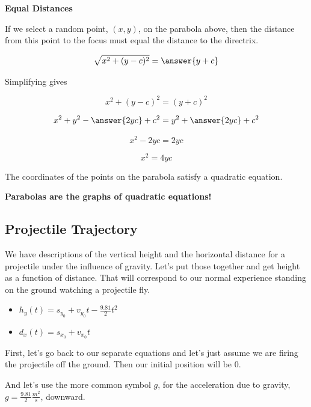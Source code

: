 \documentclass{ximera}
\begin{document}
\begin{idea} \textbf{\textcolor{blue!55!black}{Equal Distances}} 


If we select a random point, $(x,y)$, on the parabola above, then the distance from this point to the focus must equal the distance to the directrix.


\[  \sqrt{x^2 + (y-c)^2} = \answer{y+c}   \]


Simplifying gives


\[  x^2 + (y-c)^2 = (y+c)^2   \]

\[  x^2 + y^2 - \answer{2 y c} + c^2 = y^2 + \answer{2 y c} + c^2   \]

\[  x^2  - 2 y c  =  2 y c    \]

\[  x^2   =  4 y c    \]


The coordinates of the points on the parabola satisfy a quadratic equation.  


\begin{center}
\textbf{\textcolor{red!80!black}{Parabolas are the graphs of quadratic equations!}}
\end{center}


\end{idea}








\subsection*{Projectile Trajectory}


We have descriptions of the vertical height and the horizontal distance for a projectile under the influence of gravity.  Let's put those together and get height as a function of distance.  That will correspond to our normal experience standing on the ground watching a projectile fly.


\begin{itemize}
\item $h_y(t) = s_{y_0} + v_{y_0} t - \frac{9.81}{2} t^2$


\item $d_x(t) = s_{x_0} + v_{x_0} t$
\end{itemize}




First, let's go back to our separate equations and let's just assume we are firing the projectile off the ground.  Then our initial position will be $0$.  

And let's use the more common symbol $g$, for the acceleration due to gravity, $g = \frac{9.81}{2} \frac{m^2}{s}$, downward.
\end{document}
